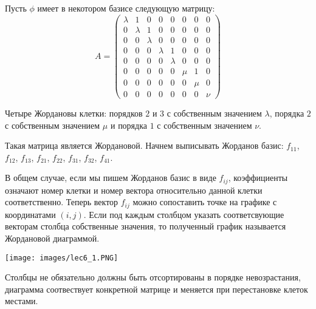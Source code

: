 \begin{example}
    Пусть $\phi$ имеет в некотором базисе следующую матрицу:
        \[A = \begin{pmatrix}
        \lambda & 1        & 0       & 0       & 0        & 0    &0    & 0\\
        0       & \lambda  & 1       & 0       & 0        & 0    &0    & 0\\
        0       & 0        & \lambda & 0       & 0        & 0    &0    & 0\\
        0       & 0        & 0       & \lambda & 1        & 0    &0    & 0\\
        0       & 0        & 0       & 0       & \lambda  & 0    &0    & 0\\
        0       & 0        & 0       & 0       & 0        & \mu  &1    & 0\\
        0       & 0        & 0       & 0       & 0        & 0    &\mu  & 0\\
        0       & 0        & 0       & 0       & 0        & 0    &0    & \nu
        \end{pmatrix}\]
        
    Четыре Жордановы клетки: порядков $2$ и $3$ с собственным значением $\lambda$, порядка $2$ с собственным значением $\mu$ и порядка $1$ с собственным значением $\nu$. 
    
    Такая матрица является Жордановой. Начнем выписывать Жорданов базис: $f_{11}$, $f_{12}$, $f_{13}$, $f_{21}$, $f_{22}$, $f_{31}$, $f_{32}$, $f_{41}$.
    
    В общем случае, если мы пишем Жорданов базис в виде $f_{ij}$, коэффициенты означают номер клетки и 
    номер вектора относительно данной клетки соответственно. Теперь вектор $f_{ij}$ можно сопоставить 
    точке на графике с координатами $(i, j)$. Если под каждым столбцом указать соответсвующие векторам столбца собственные значения, то полученный график называется Жордановой диаграммой.
    \begin{center}
        \texttt{[image: images/lec6\_1.PNG]}
    \end{center}
\end{example}

\begin{note}
    Столбцы не обязательно должны быть отсортированы в порядке невозрастания, диаграмма соотвествует 
    конкретной матрице и меняется при перестановке клеток местами.
\end{note}

